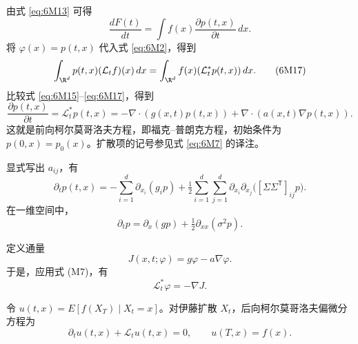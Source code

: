 由式 \eqref{eq:6M13} 可得
\begin{equation*}
  \frac{dF(t)}{dt}=\int f(x)\frac{\partial p(t,x)}{\partial t}\,dx.
  \tag{6M16}\label{eq:6M16}
\end{equation*}
将 $\varphi(x)=p(t,x)$ 代入式 \eqref{eq:6M2}，得到
\begin{equation*}
  \int_{\R^d}p(t,x)(\mathcal L_tf)(x)\,dx
      =\int_{\R^d}f(x)(\mathcal L_t^*p(t,x))\,dx.
  \tag{6M17}\label{eq:6M17}
\end{equation*}
比较式 \eqref{eq:6M15}–\eqref{eq:6M17}，得到
\begin{equation*}
  \frac{\partial p(t,x)}{\partial t}=\mathcal L_t^*p(t,x)
    =-\nabla\cdot(g(x,t)p(t,x))+\nabla\cdot(a(x,t)\nabla p(t,x)).
  \tag{6M18}\label{eq:6M18}
\end{equation*}
这就是前向柯尔莫哥洛夫方程，即福克–普朗克方程，初始条件为 $p(0,x)=p_0(x)$。扩散项的记号参见式 \eqref{eq:6M7} 的译注。


显式写出 $a_{ij}$，有
\begin{equation*}
  \partial_t p(t,x)=-\sum_{i=1}^d\partial_{x_i}(g_i p)
   +\tfrac12\sum_{i=1}^d\sum_{j=1}^d
            \partial_{x_i}\partial_{x_j}\bigl([\Sigma\Sigma^{\mathsf T}]_{ij}p\bigr).
  \tag{6M19}\label{eq:6M19}
\end{equation*}
在一维空间中，
\[
  \partial_t p=\partial_x(gp)+\tfrac12\partial_{xx}(\sigma^2p).
\]


定义通量
\[
  J(x,t;\varphi)=g\varphi-a\nabla\varphi.
\]
于是，应用式 (M7)，有
\begin{equation*}
  \mathcal L_t^*\varphi=-\nabla J.
  \tag{6M20}\label{eq:6M20}
\end{equation*}


令 $u(t,x)=E[f(X_T)\mid X_t=x]$。对伊藤扩散 $X_t$，后向柯尔莫哥洛夫偏微分方程为
\begin{equation*}
  \partial_t u(t,x)+\mathcal L_tu(t,x)=0,\qquad u(T,x)=f(x).
  \tag{6M21}\label{eq:6M21}
\end{equation*}



